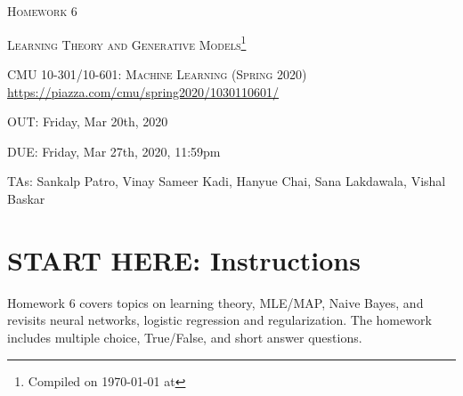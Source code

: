 \documentclass[12pt,addpoints,answers]{exam}
\begin{document}
\section*{}
\begin{center}
  \centerline{\textsc{\LARGE  Homework 6}}
  \vspace{0.5em}
  \centerline{\textsc{\LARGE Learning Theory and Generative Models}\footnote{Compiled on \today{} at \currenttime{}}}
  \vspace{1em}
  \textsc{\large CMU 10-301/10-601: Machine Learning (Spring 2020)} \\
  \vspace{0.5em}
  \url{https://piazza.com/cmu/spring2020/1030110601/} \\
  \vspace{0.5em}
  \centerline{OUT: Friday, Mar 20th, 2020}
  \vspace{0.5em}
  \centerline{DUE: Friday, Mar 27th, 2020, 11:59pm}
    \centerline{TAs: Sankalp Patro, Vinay Sameer Kadi, Hanyue Chai, Sana Lakdawala, Vishal Baskar}
\end{center}


\section*{START HERE: Instructions}

\begin{notebox}
Homework 6 covers topics on learning theory, MLE/MAP, Naive Bayes, and revisits neural networks, logistic regression and regularization. The homework includes multiple choice, True/False, and short answer questions. 
\end{notebox}
\end{document}

